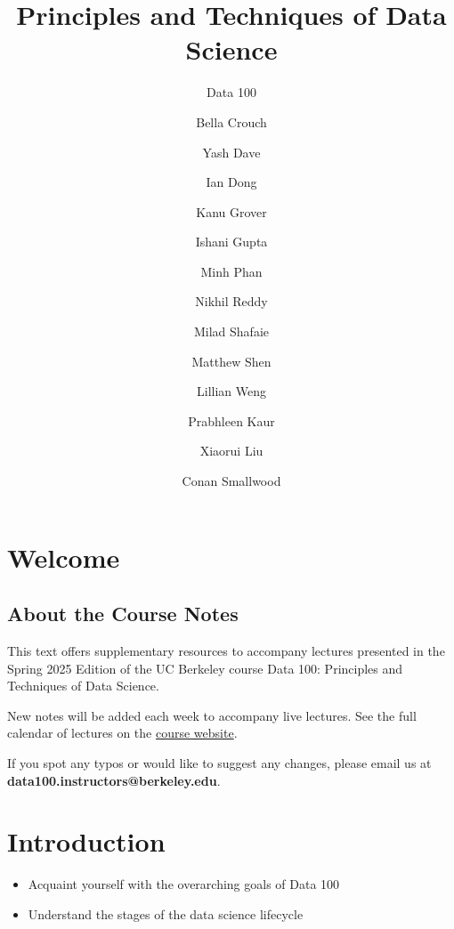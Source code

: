 \documentclass[
  letterpaper,
  DIV=11,
  numbers=noendperiod]{scrreprt}
\title{Principles and Techniques of Data Science}
\subtitle{Data 100}
\author{Bella Crouch \and Yash Dave \and Ian Dong \and Kanu
Grover \and Ishani Gupta \and Minh Phan \and Nikhil Reddy \and Milad
Shafaie \and Matthew Shen \and Lillian Weng \and Prabhleen
Kaur \and Xiaorui Liu \and Conan Smallwood}
\date{}
\providecommand{\tightlist}{%
  \setlength{\itemsep}{0pt}\setlength{\parskip}{0pt}}\usepackage{longtable,booktabs,array}
\renewcommand*\contentsname{Table of contents}
\newcommand\contentsname{Table of contents}
\begin{document}
\maketitle

\renewcommand*\contentsname{Table of contents}
{
\hypersetup{linkcolor=}
\setcounter{tocdepth}{2}
\tableofcontents
}


\chapter*{Welcome}\label{welcome}


\section*{About the Course Notes}\label{about-the-course-notes}


This text offers supplementary resources to accompany lectures presented
in the Spring 2025 Edition of the UC Berkeley course Data 100:
Principles and Techniques of Data Science.

New notes will be added each week to accompany live lectures. See the
full calendar of lectures on the \href{https://ds100.org/sp25/}{course
website}.

If you spot any typos or would like to suggest any changes, please email
us at \textbf{data100.instructors@berkeley.edu}.


\chapter{Introduction}\label{introduction}

\begin{tcolorbox}[enhanced jigsaw, arc=.35mm, left=2mm, toprule=.15mm, leftrule=.75mm, bottomrule=.15mm, colframe=quarto-callout-note-color-frame, rightrule=.15mm, colbacktitle=quarto-callout-note-color!10!white, opacitybacktitle=0.6, coltitle=black, bottomtitle=1mm, colback=white, toptitle=1mm, title=\textcolor{quarto-callout-note-color}{\faInfo}\hspace{0.5em}{Learning Outcomes}, breakable, opacityback=0, titlerule=0mm]

\begin{itemize}
\tightlist
\item
  Acquaint yourself with the overarching goals of Data 100
\item
  Understand the stages of the data science lifecycle
\end{itemize}

\end{tcolorbox}
\end{document}
